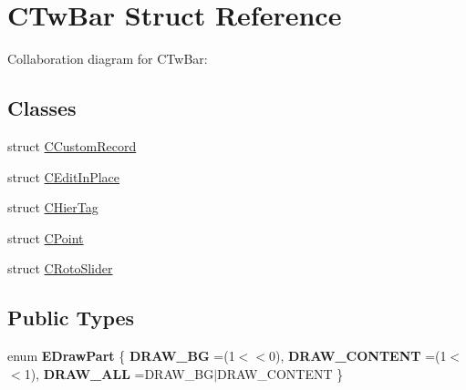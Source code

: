 \hypertarget{struct_c_tw_bar}{\section{C\+Tw\+Bar Struct Reference}
\label{struct_c_tw_bar}
}


Collaboration diagram for C\+Tw\+Bar\+:
\subsection*{Classes}
\begin{DoxyCompactItemize}
\item 
struct \hyperlink{struct_c_tw_bar_1_1_c_custom_record}{C\+Custom\+Record}
\item 
struct \hyperlink{struct_c_tw_bar_1_1_c_edit_in_place}{C\+Edit\+In\+Place}
\item 
struct \hyperlink{struct_c_tw_bar_1_1_c_hier_tag}{C\+Hier\+Tag}
\item 
struct \hyperlink{struct_c_tw_bar_1_1_c_point}{C\+Point}
\item 
struct \hyperlink{struct_c_tw_bar_1_1_c_roto_slider}{C\+Roto\+Slider}
\end{DoxyCompactItemize}
\subsection*{Public Types}
\begin{DoxyCompactItemize}
\item 
\hypertarget{struct_c_tw_bar_a5b7a8e3bfdf78576d76019461696b1ef}{enum {\bfseries E\+Draw\+Part} \{ {\bfseries D\+R\+A\+W\+\_\+\+B\+G} =(1$<$$<$0), 
{\bfseries D\+R\+A\+W\+\_\+\+C\+O\+N\+T\+E\+N\+T} =(1$<$$<$1), 
{\bfseries D\+R\+A\+W\+\_\+\+A\+L\+L} =D\+R\+A\+W\+\_\+\+B\+G$\vert$\+D\+R\+A\+W\+\_\+\+C\+O\+N\+T\+E\+N\+T
 \}}\label{struct_c_tw_bar_a5b7a8e3bfdf78576d76019461696b1ef}

\end{DoxyCompactItemize}
